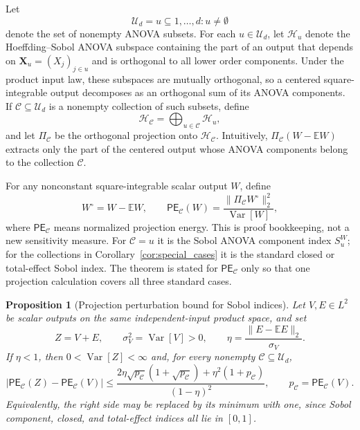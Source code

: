 \documentclass[11pt,letterpaper]{article}
\DeclareMathOperator{\Var}{Var}
\newcommand{\E}{\mathbb{E}}
\newcommand{\bX}{\boldsymbol{X}}
\newtheorem{proposition}{Proposition}
\theoremstyle{remark}
\begin{document}
Let
\begin{equation}
  \mathcal U_d={u\subseteq{1,\ldots,d}:u\neq\emptyset}
\end{equation}
denote the set of nonempty ANOVA subsets. For each $u\in\mathcal U_d$, let
$\mathcal H_u$ denote the Hoeffding--Sobol ANOVA subspace containing the part of
an output that depends on $\bX_u=(X_j)_{j\in u}$ and is orthogonal to all lower
order components. Under the product input law, these subspaces are mutually
orthogonal, so a centered square-integrable output decomposes as an orthogonal
sum of its ANOVA components. If $\mathscr C\subseteq\mathcal U_d$ is a nonempty
collection of such subsets, define
\begin{equation}
  \mathcal H_{\mathscr C}=\bigoplus_{u\in\mathscr C}\mathcal H_u,
\end{equation}
and let $\Pi_{\mathscr C}$ be the orthogonal projection onto
$\mathcal H_{\mathscr C}$. Intuitively, $\Pi_{\mathscr C}(W-\E W)$ extracts only
the part of the centered output whose ANOVA components belong to the collection
$\mathscr C$.

For any nonconstant square-integrable scalar output $W$, define
\begin{equation}
  W^\circ=W-\E W,
  \qquad
  \mathsf{PE}_{\mathscr C}(W)
  =\frac{\|\Pi_{\mathscr C} W^\circ\|_2^2}{\Var[W]},
  \label{eq:pe_def}
\end{equation}
where $\mathsf{PE}_{\mathscr C}$ means normalized projection energy. This is
proof bookkeeping, not a new sensitivity measure. For $\mathscr C={u}$ it is
the Sobol ANOVA component index $S_u^W$; for the collections in
Corollary~\ref{cor:special_cases} it is the standard closed or total-effect
Sobol index. The theorem is stated for $\mathsf{PE}_{\mathscr C}$ only so that
one projection calculation covers all three standard cases.

\begin{proposition}[Projection perturbation bound for Sobol indices]
\label{prop:abstract_bound}
Let $V,E\in L^2$ be scalar outputs on the same independent-input product space,
and set
\begin{equation}
  Z=V+E,
  \qquad
  \sigma_V^2=\Var[V]>0,
  \qquad
  \eta=\frac{\|E-\E E\|_2}{\sigma_V}.
  \label{eq:eta_def}
\end{equation}
If $\eta<1$, then $0<\Var[Z]<\infty$ and, for every nonempty
$\mathscr C\subseteq\mathcal U_d$,
\begin{equation}
  \left|\mathsf{PE}_{\mathscr C}(Z)-\mathsf{PE}_{\mathscr C}(V)\right|
  \leq
  \frac{
    2\eta\sqrt{p_{\mathscr C}}(1+\sqrt{p_{\mathscr C}})
    +\eta^2(1+p_{\mathscr C})
  }{(1-\eta)^2},
  \qquad
  p_{\mathscr C}=\mathsf{PE}_{\mathscr C}(V).
  \label{eq:abstract_bound}
\end{equation}
Equivalently, the right side may be replaced by its minimum with one, since
Sobol component, closed, and total-effect indices all lie in $[0,1]$.
\end{proposition}
\end{document}
